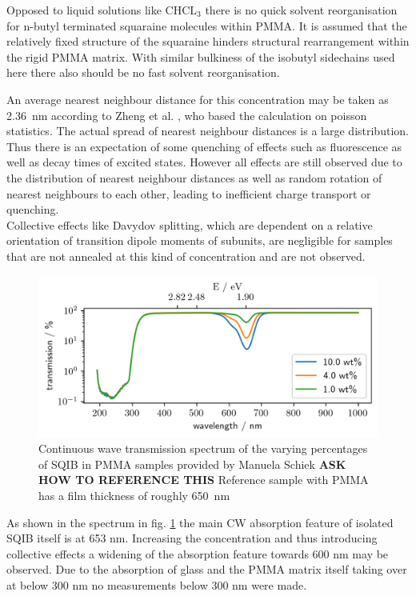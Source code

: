 \documentclass[twoside,openright]{scrreprt}
\begin{document}
Opposed to liquid solutions like $\mathrm{CHCL_3}$ there is no quick solvent reorganisation for n-butyl terminated squaraine molecules within PMMA. It is assumed that the relatively fixed structure of the squaraine hinders structural rearrangement within the rigid PMMA matrix. With similar bulkiness of the isobutyl sidechains used here there also should be no fast solvent reorganisation. \cite{Zheng2020}

An average nearest neighbour distance for this concentration may be taken as \SI{2.36}{\nano\meter} according to Zheng et al. \cite{Zheng2020}, who based the calculation on poisson statistics\cite{Krider2003}. The actual spread of nearest neighbour distances is a large distribution. Thus there is an expectation of some quenching of effects such as fluorescence as well as decay times of excited states. However all effects are still observed due to the distribution of nearest neighbour distances as well as random rotation of nearest neighbours to each other, leading to inefficient charge transport or quenching.\cite{Zheng2020} \\
Collective effects like Davydov splitting, which are dependent on a relative orientation of transition dipole moments of subunits, are negligible for samples that are not annealed at this kind of concentration and are not observed.\\

\begin{figure}[!htp]
\centering
\includegraphics[scale = 1]{images/SQIB_VarPercentInPMMA_transmission.png}
\caption{Continuous wave transmission spectrum of the varying percentages of SQIB in PMMA samples provided by Manuela Schiek\label{fig:VarpercentCWspectrum} \textbf{ASK HOW TO REFERENCE THIS} Reference sample with PMMA has a film thickness of roughly \SI{650}{\nano\meter}}
\end{figure}

As shown in the spectrum in fig. \ref{fig:VarpercentCWspectrum} the main CW absorption feature of isolated SQIB itself is at 653 nm. Increasing the concentration and thus introducing collective effects a widening of the absorption feature towards 600 nm may be observed. Due to the absorption of glass and the PMMA matrix itself taking over at below 300 nm no measurements below 300 nm were made.\\
\end{document}
